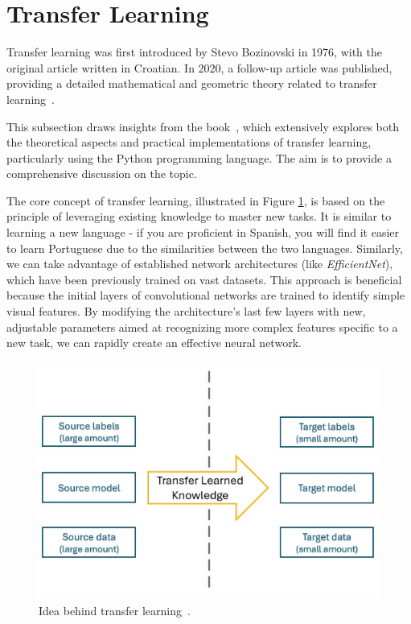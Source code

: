 
\section{Transfer Learning}
\label{sec:transferLearning}
Transfer learning was first introduced by Stevo Bozinovski in 1976, with the original article written in Croatian. In 2020, a follow-up article was published, providing a detailed mathematical and geometric theory related to transfer learning~\cite{TransferLearningFirst}.

This subsection draws insights from the book~\cite{TransferLearning}, which extensively explores both the theoretical aspects and practical implementations of transfer learning, particularly using the Python programming language. The aim is to provide a comprehensive discussion on the topic.

The core concept of transfer learning, illustrated in Figure \ref{fig:transferLearning}, is based on the principle of leveraging existing knowledge to master new tasks. It is similar to learning a new language - if you are proficient in Spanish, you will find it easier to learn Portuguese due to the similarities between the two languages. Similarly, we can take advantage of established network architectures (like \textit{EfficientNet}), which have been previously trained on vast datasets. This approach is beneficial because the initial layers of convolutional networks are trained to identify simple visual features. By modifying the architecture's last few layers with new, adjustable parameters aimed at recognizing more complex features specific to a new task, we can rapidly create an effective neural network.

\begin{figure}[!htb]
    \centering
    \includegraphics[scale=0.8]{Images/transfer-learning.jpeg}
    \caption{Idea behind transfer learning~\cite{TransferLearningExample}.}
    \label{fig:transferLearning}
\end{figure}

